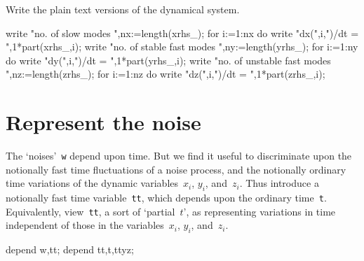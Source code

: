 \documentclass[11pt,a5paper]{article}
\begin{document}
Write the plain text versions of the dynamical system.
\begin{reduce}
write "no. of slow modes ",nx:=length(xrhs_);
for i:=1:nx do write "dx(",i,")/dt = ",1*part(xrhs_,i);
write "no. of stable fast modes ",ny:=length(yrhs_);
for i:=1:ny do write "dy(",i,")/dt = ",1*part(yrhs_,i);
write "no. of unstable fast modes ",nz:=length(zrhs_);
for i:=1:nz do write "dz(",i,")/dt = ",1*part(zrhs_,i);
\end{reduce}



\section{Represent the noise}

The `noises'~\verb|w| depend upon time. But we find it
useful to discriminate upon the notionally fast time
fluctuations of a noise process, and the notionally ordinary
time variations of the dynamic variables~$x_i$, $y_i$,
and~$z_i$. Thus introduce a notionally fast time
variable~\verb|tt|, which depends upon the ordinary
time~\verb|t|. Equivalently, view~\verb|tt|, a sort of
`partial~$t$', as representing variations in time
independent of those in the variables~$x_i$, $y_i$,
and~$z_i$.
\begin{reduce}
depend w,tt;
depend tt,t,ttyz;
\end{reduce}
\end{document}
